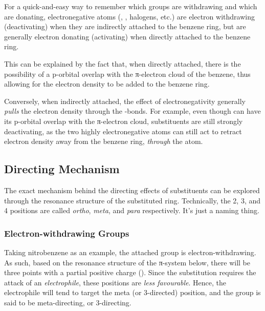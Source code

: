 			For a quick-and-easy way to remember which groups are withdrawing and which are donating, electronegative atoms (,
			, halogens, etc.) are electron withdrawing (deactivating) when they are indirectly attached to the benzene ring, but
			are generally electron donating (activating) when directly attached to the benzene ring.

			This can be explained by the fact that, when directly attached, there is the possibility of a p-orbital overlap with the
			π-electron cloud of the benzene, thus allowing for the electron density to be added to the benzene ring.

			Conversely, when indirectly attached, the effect of electronegativity generally \textit{pulls} the electron density
			through the \chemsigma-bonds. For example, even though  can have its p-orbital overlap with the π-electron cloud,
			 substituents are still strongly deactivating, as the two highly electronegative  atoms can still act
			to retract electron density away from the benzene ring, \textit{through} the  atom.



			\subsection{Directing Mechanism}

				The exact mechanism behind the directing effects of substituents can be explored through the resonance structure
				of the substituted ring. Technically, the 2, 3, and 4 positions are called \textit{ortho}, \textit{meta}, and \textit{para}
				respectively. It's just a naming thing.

				\pagebreak
				\subsubsection{Electron-withdrawing Groups}

				Taking nitrobenzene as an example, the attached  group is electron-withdrawing. As such, based on the resonance
				structure of the π-system below, there will be three points with a partial positive charge (\deltap). Since the
				substitution requires the attack of an \textit{electrophile}, these positions are \textit{less favourable}. Hence, the
				electrophile will tend to target the meta (or 3-directed) position, and the  group is said to be meta-directing,
				or 3-directing.


